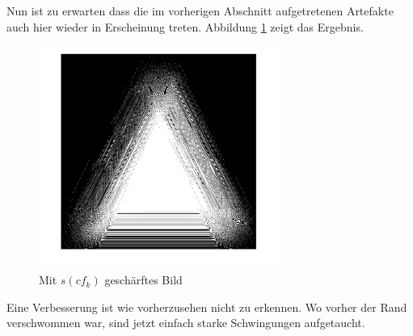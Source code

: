 Nun ist zu erwarten dass die im vorherigen Abschnitt aufgetretenen Artefakte auch hier wieder in Erscheinung treten.
Abbildung \ref{deconvolve:ergebnis} zeigt das Ergebnis.
\begin{figure}[h]
\centering
\includegraphics[width=0.7\textwidth]{./papers/deconvolve/pictures/dreieck_sharp.png}
\caption{Mit $s(cf_k)$ \glqq geschärftes\grqq{} Bild\label{deconvolve:ergebnis}}
\end{figure}
 
Eine Verbesserung ist wie vorherzusehen nicht zu erkennen. Wo vorher der Rand verschwommen war, sind jetzt einfach starke Schwingungen aufgetaucht.
